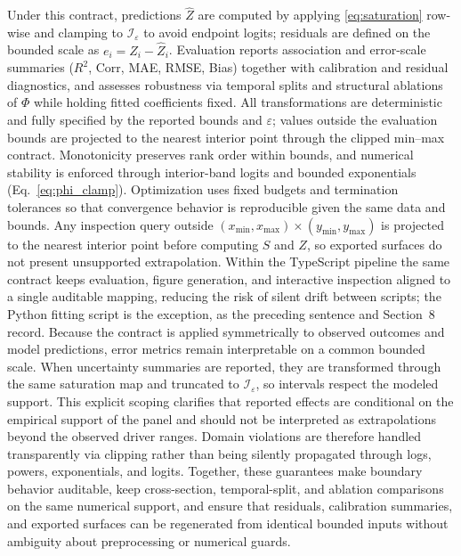 \documentclass[11pt]{article}
\begin{document}
Under this contract, predictions $\widehat{Z}$ are computed by applying \eqref{eq:saturation} row-wise and clamping to $\mathcal{I}_\varepsilon$ to avoid endpoint logits; residuals are defined on the bounded scale as $e_i=Z_i-\widehat{Z}_i$. Evaluation reports association and error-scale summaries ($R^2$, $\mathrm{Corr}$, MAE, RMSE, Bias) together with calibration and residual diagnostics, and assesses robustness via temporal splits and structural ablations of $\Phi$ while holding fitted coefficients fixed. All transformations are deterministic and fully specified by the reported bounds and $\varepsilon$; values outside the evaluation bounds are projected to the nearest interior point through the clipped min--max contract. Monotonicity preserves rank order within bounds, and numerical stability is enforced through interior-band logits and bounded exponentials (Eq.~\eqref{eq:phi_clamp}). Optimization uses fixed budgets and termination tolerances so that convergence behavior is reproducible given the same data and bounds. Any inspection query outside $(x_{\min},x_{\max})\times(y_{\min},y_{\max})$ is projected to the nearest interior point before computing $S$ and $Z$, so exported surfaces do not present unsupported extrapolation. Within the TypeScript pipeline the same contract keeps evaluation, figure generation, and interactive inspection aligned to a single auditable mapping, reducing the risk of silent drift between scripts; the Python fitting script is the exception, as the preceding sentence and Section~8 record. Because the contract is applied symmetrically to observed outcomes and model predictions, error metrics remain interpretable on a common bounded scale. When uncertainty summaries are reported, they are transformed through the same saturation map and truncated to $\mathcal{I}_\varepsilon$, so intervals respect the modeled support. This explicit scoping clarifies that reported effects are conditional on the empirical support of the panel and should not be interpreted as extrapolations beyond the observed driver ranges. Domain violations are therefore handled transparently via clipping rather than being silently propagated through logs, powers, exponentials, and logits. Together, these guarantees make boundary behavior auditable, keep cross-section, temporal-split, and ablation comparisons on the same numerical support, and ensure that residuals, calibration summaries, and exported surfaces can be regenerated from identical bounded inputs without ambiguity about preprocessing or numerical guards.
\end{document}
